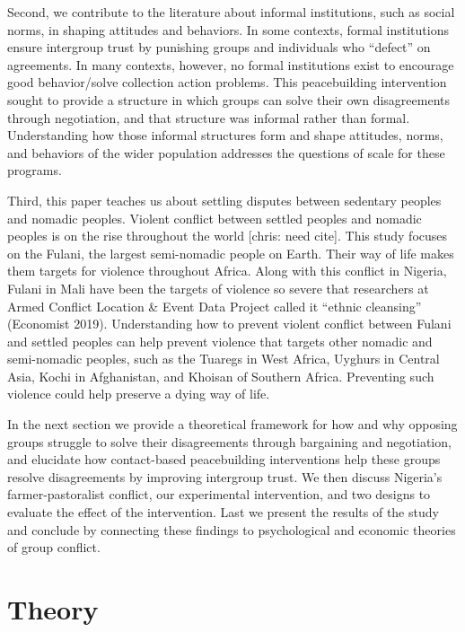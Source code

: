 \documentclass[11pt]{article}
\begin{document}
Second, we contribute to the literature about informal institutions,
such as social norms, in shaping attitudes and behaviors. In some
contexts, formal institutions ensure intergroup trust by punishing
groups and individuals who ``defect'' on agreements. In many contexts,
however, no formal institutions exist to encourage good behavior/solve
collection action problems. This peacebuilding intervention sought to
provide a structure in which groups can solve their own disagreements
through negotiation, and that structure was informal rather than formal.
Understanding how those informal structures form and shape attitudes,
norms, and behaviors of the wider population addresses the questions of
scale for these programs.

Third, this paper teaches us about settling disputes between sedentary
peoples and nomadic peoples. Violent conflict between settled peoples
and nomadic peoples is on the rise throughout the world {[}chris: need
cite{]}. This study focuses on the Fulani, the largest semi-nomadic
people on Earth. Their way of life makes them targets for violence
throughout Africa. Along with this conflict in Nigeria, Fulani in Mali
have been the targets of violence so severe that researchers at Armed
Conflict Location \& Event Data Project called it ``ethnic cleansing''
(Economist 2019). Understanding how to prevent violent conflict between
Fulani and settled peoples can help prevent violence that targets other
nomadic and semi-nomadic peoples, such as the Tuaregs in West Africa,
Uyghurs in Central Asia, Kochi in Afghanistan, and Khoisan of Southern
Africa. Preventing such violence could help preserve a dying way of
life.

In the next section we provide a theoretical framework for how and why
opposing groups struggle to solve their disagreements through bargaining
and negotiation, and elucidate how contact-based peacebuilding
interventions help these groups resolve disagreements by improving
intergroup trust. We then discuss Nigeria's farmer-pastoralist conflict,
our experimental intervention, and two designs to evaluate the effect of
the intervention. Last we present the results of the study and conclude
by connecting these findings to psychological and economic theories of
group conflict.

\hypertarget{theory}{%
\section{Theory}\label{theory}}
\end{document}
